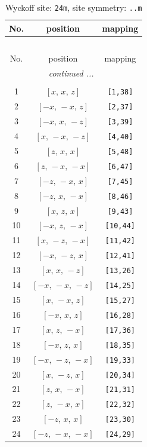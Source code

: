 \documentclass[fleqn,8pt]{jsarticle}
\begin{document}
\begin{longtable}{ccc}
\caption{Wyckoff site: {\tt 24m}, site symmetry: {\tt ..m}}
 \\
 \hline \hline
No. & position & mapping \\ \hline \endfirsthead

\multicolumn{2}{l}{\tablename\ \thetable{}} \\
 \hline \hline
No. & position & mapping \\ \hline \endhead

 \hline \hline
\multicolumn{2}{r}{\footnotesize\it continued ...} \\ \endfoot

 \hline \hline
\multicolumn{2}{r}{} \\ \endlastfoot

1 & $\left[ x,\, x,\, z \right]$ & {\tt [1,38]} \\ \hline
2 & $\left[ - x,\, - x,\, z \right]$ & {\tt [2,37]} \\ \hline
3 & $\left[ - x,\, x,\, - z \right]$ & {\tt [3,39]} \\ \hline
4 & $\left[ x,\, - x,\, - z \right]$ & {\tt [4,40]} \\ \hline
5 & $\left[ z,\, x,\, x \right]$ & {\tt [5,48]} \\ \hline
6 & $\left[ z,\, - x,\, - x \right]$ & {\tt [6,47]} \\ \hline
7 & $\left[ - z,\, - x,\, x \right]$ & {\tt [7,45]} \\ \hline
8 & $\left[ - z,\, x,\, - x \right]$ & {\tt [8,46]} \\ \hline
9 & $\left[ x,\, z,\, x \right]$ & {\tt [9,43]} \\ \hline
10 & $\left[ - x,\, z,\, - x \right]$ & {\tt [10,44]} \\ \hline
11 & $\left[ x,\, - z,\, - x \right]$ & {\tt [11,42]} \\ \hline
12 & $\left[ - x,\, - z,\, x \right]$ & {\tt [12,41]} \\ \hline
13 & $\left[ x,\, x,\, - z \right]$ & {\tt [13,26]} \\ \hline
14 & $\left[ - x,\, - x,\, - z \right]$ & {\tt [14,25]} \\ \hline
15 & $\left[ x,\, - x,\, z \right]$ & {\tt [15,27]} \\ \hline
16 & $\left[ - x,\, x,\, z \right]$ & {\tt [16,28]} \\ \hline
17 & $\left[ x,\, z,\, - x \right]$ & {\tt [17,36]} \\ \hline
18 & $\left[ - x,\, z,\, x \right]$ & {\tt [18,35]} \\ \hline
19 & $\left[ - x,\, - z,\, - x \right]$ & {\tt [19,33]} \\ \hline
20 & $\left[ x,\, - z,\, x \right]$ & {\tt [20,34]} \\ \hline
21 & $\left[ z,\, x,\, - x \right]$ & {\tt [21,31]} \\ \hline
22 & $\left[ z,\, - x,\, x \right]$ & {\tt [22,32]} \\ \hline
23 & $\left[ - z,\, x,\, x \right]$ & {\tt [23,30]} \\ \hline
24 & $\left[ - z,\, - x,\, - x \right]$ & {\tt [24,29]} \\
\end{longtable}
\end{document}
